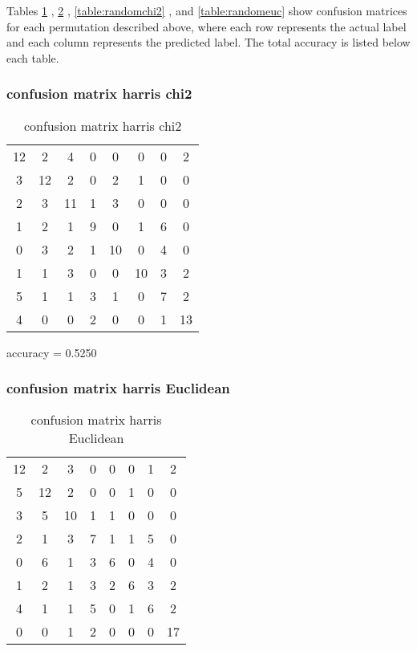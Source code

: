 \documentclass[12pt]{article}
\begin{document}
Tables \ref{table:harrischi2} , \ref{table:harriseuc} , \ref{table:randomchi2} , and \ref{table:randomeuc} show confusion matrices for each permutation described above, where each row represents the actual label and each column represents the predicted label. The total accuracy is listed below each table.






\subsubsection{confusion matrix harris chi2}
\begin{table}[H]
\centering
\begin{tabular}{c c c c c c c c}
    12 &     2 &     4 &     0 &     0 &     0 &     0 &     2 \\
     3 &    12 &     2 &     0 &     2 &     1 &     0 &     0 \\
     2 &     3 &    11 &     1 &     3 &     0 &     0 &     0 \\
     1 &     2 &     1 &     9 &     0 &     1 &     6 &     0 \\
     0 &     3 &     2 &     1 &    10 &     0 &     4 &     0 \\
     1 &     1 &     3 &     0 &     0 &    10 &     3 &     2 \\
     5 &     1 &     1 &     3 &     1 &     0 &     7 &     2 \\
     4 &     0 &     0 &     2 &     0 &     0 &     1 &    13 
\end{tabular}
\caption{confusion matrix harris chi2}
\label{table:harrischi2}
\end{table}


accuracy = 0.5250


\subsubsection{confusion matrix harris Euclidean}
\begin{table}[H]
\centering
\begin{tabular}{c c c c c c c c}
    12 &     2 &     3 &     0 &     0 &     0 &     1 &     2 \\
     5 &    12 &     2 &     0 &     0 &     1 &     0 &     0 \\
     3 &     5 &    10 &     1 &     1 &     0 &     0 &     0 \\
     2 &     1 &     3 &     7 &     1 &     1 &     5 &     0 \\
     0 &     6 &     1 &     3 &     6 &     0 &     4 &     0 \\
     1 &     2 &     1 &     3 &     2 &     6 &     3 &     2 \\
     4 &     1 &     1 &     5 &     0 &     1 &     6 &     2 \\
     0 &     0 &     1 &     2 &     0 &     0 &     0 &    17 
\end{tabular}
\caption{confusion matrix harris Euclidean}
\label{table:harriseuc}
\end{table}
\end{document}
